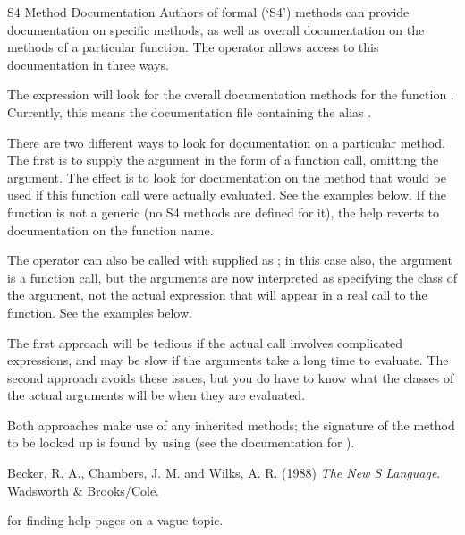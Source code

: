 %
\begin{Section}{S4 Method Documentation}
Authors of formal (`S4') methods can provide documentation
on specific methods, as well as overall documentation on the methods
of a particular function.  The  operator allows access to
this documentation in three ways.

The expression  will look for the overall
documentation methods for the function .  Currently,
this means the documentation file containing the alias
.

There are two different ways to look for documentation on a
particular method.  The first is to supply the  argument
in the form of a function call, omitting the  argument.
The effect is to look for documentation on the method that would be
used if this function call were actually evaluated. See the examples
below.  If the function is not a generic (no S4 methods are defined
for it), the help reverts to documentation on the function name.

The  operator can also be called with  supplied
as ; in this case also, the  argument is
a function call, but the arguments are now interpreted as specifying
the class of the argument, not the actual expression that will
appear in a real call to the function.  See the examples below.

The first approach will be tedious if the actual call involves
complicated expressions, and may be slow if the arguments take a
long time to evaluate.  The second approach avoids these
issues, but you do have to know what the classes of the actual
arguments will be when they are evaluated.

Both approaches make use of any inherited methods; the signature of
the method to be looked up is found by using 
(see the documentation for ).
\end{Section}
%
\begin{References}\relax
Becker, R. A., Chambers, J. M. and Wilks, A. R. (1988)
\emph{The New S Language}.
Wadsworth \& Brooks/Cole.
\end{References}
%
\begin{SeeAlso}\relax
{}

 for finding help pages on a vague topic.
\end{SeeAlso}
%
